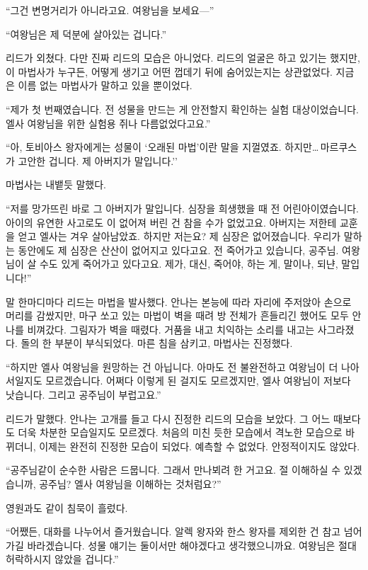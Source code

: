 ``그건 변명거리가 아니라고요. 여왕님을 보세요—''

``여왕님은 제 덕분에 살아있는 겁니다.''

리드가 외쳤다. 다만 진짜 리드의 모습은 아니었다. 리드의 얼굴은 하고 있기는 했지만, 이 마법사가 누구든, 어떻게 생기고 어떤 껍데기 뒤에 숨어있는지는 상관없었다. 지금은 이름 없는 마법사가 말하고 있을 뿐이었다.

``제가 첫 번째였습니다. 전 성물을 만드는 게 안전할지 확인하는 실험 대상이었습니다. 엘사 여왕님을 위한 실험용 쥐나 다름없었다고요.''

``아, 토비아스 왕자에게는 성물이 `오래된 마법'이란 말을 지껄였죠. 하지만\ldots\,마르쿠스가 고안한 겁니다. 제 아버지가 말입니다.''

마법사는 내뱉듯 말했다.

``저를 망가뜨린 바로 그 아버지가 말입니다. 심장을 희생했을 때 전 어린아이였습니다. 아이의 유연한 사고로도 이 없어져 버린 건 참을 수가 없었고요. 아버지는 저한테 교훈을 얻고 엘사는 겨우 살아남았죠. 하지만 저는요? 제 심장은 없어졌습니다. 우리가 말하는 동안에도 제 심장은 산산이 없어지고 있다고요. 전 죽어가고 있습니다, 공주님. 여왕님이 살 수도 있게 죽어가고 있다고요. 제가, 대신, 죽어야, 하는 게, 말이나, 되냔, 말입니다!''

말 한마디마다 리드는 마법을 발사했다. 안나는 본능에 따라 자리에 주저앉아 손으로 머리를 감쌌지만, 마구 쏘고 있는 마법이 벽을 때려 방 전체가 흔들리긴 했어도 모두 안나를 비껴갔다. 그림자가 벽을 때렸다. 거품을 내고 치익하는 소리를 내고는 사그라졌다. 돌의 한 부분이 부식되었다. 마른 침을 삼키고, 마법사는 진정했다.

``하지만 엘사 여왕님을 원망하는 건 아닙니다. 아마도 전 불완전하고 여왕님이 더 나아서일지도 모르겠습니다. 어쩌다 이렇게 된 걸지도 모르겠지만, 엘사 여왕님이 저보다 낫습니다. 그리고 공주님이 부럽고요.''

리드가 말했다. 안나는 고개를 들고 다시 진정한 리드의 모습을 보았다. 그 어느 때보다도 더욱 차분한 모습일지도 모르겠다. 처음의 미친 듯한 모습에서 격노한 모습으로 바뀌더니, 이제는 완전히 진정한 모습이 되었다. 예측할 수 없었다. 안정적이지도 않았다.

``공주님같이 순수한 사람은 드뭅니다. 그래서 만나뵈려 한 거고요. 절 이해하실 수 있겠습니까, 공주님? 엘사 여왕님을 이해하는 것처럼요?''

영원과도 같이 침묵이 흘렀다.

``어쨌든, 대화를 나누어서 즐거웠습니다. 알렉 왕자와 한스 왕자를 제외한 건 참고 넘어가길 바라겠습니다. 성물 얘기는 둘이서만 해야겠다고 생각했으니까요. 여왕님은 절대 허락하시지 않았을 겁니다.''

